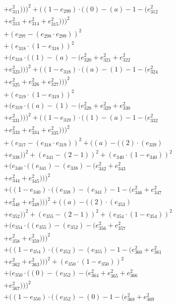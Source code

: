 \documentclass[10pt, a4paper]{article}
\begin{document}
\begin{align*}
& + e_{311}^{2})))^{2} + ((1 - e_{299})  \cdot  ((0) - (a) - 1 - (e_{312}^{2} \\
& + e_{313}^{2} + e_{314}^{2} + e_{315}^{2})))^{2} \\
& + (e_{297} - (e_{298}  \cdot  e_{299}))^{2} \\
& + (e_{318}  \cdot  (1 - e_{318}))^{2} \\
& + (e_{318}  \cdot  ((1) - (a) - (e_{320}^{2} + e_{321}^{2} + e_{322}^{2} \\
& + e_{323}^{2})))^{2} + ((1 - e_{318})  \cdot  ((a) - (1) - 1 - (e_{324}^{2} \\
& + e_{325}^{2} + e_{326}^{2} + e_{327}^{2})))^{2} \\
& + (e_{319}  \cdot  (1 - e_{319}))^{2} \\
& + (e_{319}  \cdot  ((a) - (1) - (e_{328}^{2} + e_{329}^{2} + e_{330}^{2} \\
& + e_{331}^{2})))^{2} + ((1 - e_{319})  \cdot  ((1) - (a) - 1 - (e_{332}^{2} \\
& + e_{333}^{2} + e_{334}^{2} + e_{335}^{2})))^{2} \\
& + (e_{317} - (e_{318}  \cdot  e_{319}))^{2} + ((a) - ((2)  \cdot  (e_{339}) \\
& + e_{338}))^{2} + (e_{341} - (2 - 1))^{2} + (e_{340}  \cdot  (1 - e_{340}))^{2} \\
& + (e_{340}  \cdot  ((e_{341}) - (e_{338}) - (e_{342}^{2} + e_{343}^{2} \\
& + e_{344}^{2} + e_{345}^{2})))^{2} \\
& + ((1 - e_{340})  \cdot  ((e_{338}) - (e_{341}) - 1 - (e_{346}^{2} + e_{347}^{2} \\
& + e_{348}^{2} + e_{349}^{2})))^{2} + ((a) - ((2)  \cdot  (e_{353}) \\
& + e_{352}))^{2} + (e_{355} - (2 - 1))^{2} + (e_{354}  \cdot  (1 - e_{354}))^{2} \\
& + (e_{354}  \cdot  ((e_{355}) - (e_{352}) - (e_{356}^{2} + e_{357}^{2} \\
& + e_{358}^{2} + e_{359}^{2})))^{2} \\
& + ((1 - e_{354})  \cdot  ((e_{352}) - (e_{355}) - 1 - (e_{360}^{2} + e_{361}^{2} \\
& + e_{362}^{2} + e_{363}^{2})))^{2} + (e_{350}  \cdot  (1 - e_{350}))^{2} \\
& + (e_{350}  \cdot  ((0) - (e_{352}) - (e_{364}^{2} + e_{365}^{2} + e_{366}^{2} \\
& + e_{367}^{2})))^{2} \\
& + ((1 - e_{350})  \cdot  ((e_{352}) - (0) - 1 - (e_{368}^{2} + e_{369}^{2} \\

\end{align*}
\end{document}

